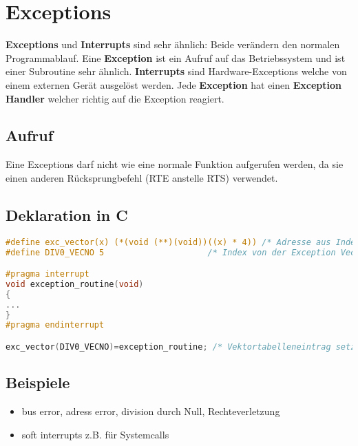 \section{Exceptions}
\textbf{Exceptions} und \textbf{Interrupts} sind sehr ähnlich: Beide verändern den normalen Programmablauf.
Eine \textbf{Exception} ist ein Aufruf auf das Betriebssystem und ist einer Subroutine sehr ähnlich. 
\textbf{Interrupts} sind Hardware-Exceptions welche von einem externen Gerät ausgelöst werden.
Jede \textbf{Exception} hat einen \textbf{Exception Handler} welcher richtig auf die Exception reagiert.

\subsection{Aufruf}
Eine Exceptions darf nicht wie eine normale Funktion aufgerufen werden, da sie einen anderen Rücksprungbefehl (RTE anstelle RTS) verwendet.

\subsection{Deklaration in C}

\begin{lstlisting}[language=C]
#define exc_vector(x) (*(void (**)(void))((x) * 4)) /* Adresse aus Index berechnen */
#define DIV0_VECNO 5                     /* Index von der Exception Vector Assignment */

#pragma interrupt
void exception_routine(void)
{
...
}
#pragma endinterrupt

exc_vector(DIV0_VECNO)=exception_routine; /* Vektortabelleneintrag setzen exc_div0 ist ein funktionsname*/
\end{lstlisting}

\subsection{Beispiele} 
\begin{itemize}
  \item bus error, adress error, division durch Null, Rechteverletzung
  \item soft interrupts z.B. für Systemcalls
\end{itemize}

